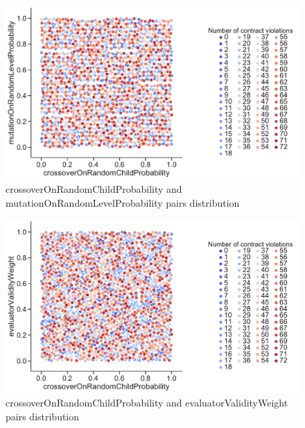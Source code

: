 \begin{figure}
	\centering
	\includegraphics[width=\textwidth]{images/PairsDistr/crossoverOnRandomChildProbability_mutationOnRandomLevelProbability.pdf}
	\caption[crossoverOnRandomChildProbability and mutationOnRandomLevelProbability pairs distribution]{crossoverOnRandomChildProbability and mutationOnRandomLevelProbability pairs distribution}
	\label{fig:crossoverOnRandomChildProbability_mutationOnRandomLevelProbability_pair}
\end{figure}
\clearpage
\begin{figure}
	\centering
	\includegraphics[width=\textwidth]{images/PairsDistr/crossoverOnRandomChildProbability_evaluatorValidityWeight.pdf}
	\caption[crossoverOnRandomChildProbability and evaluatorValidityWeight pairs distribution]{crossoverOnRandomChildProbability and evaluatorValidityWeight pairs distribution}
	\label{fig:crossoverOnRandomChildProbability_evaluatorValidityWeight_pair}
\end{figure}
\clearpage

